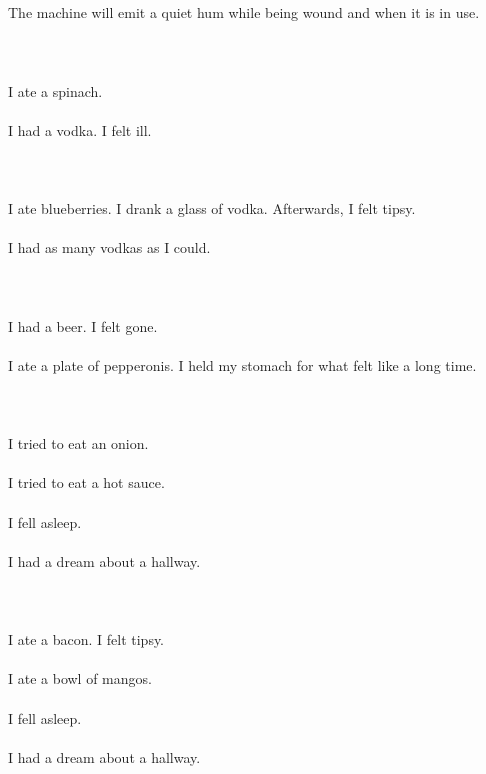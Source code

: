 \documentclass{article}
\begin{document}
    \section{}
    The machine will emit a quiet hum while being wound and when it is in use.\\\\ 
    \newpage
    
    \section{}
    I ate a spinach.\\\\I had a vodka. I felt ill.\\\\ 
    \newpage
    
    \section{}
    I ate blueberries. I drank a glass of vodka. Afterwards, I felt tipsy.\\\\I had as many vodkas as I could.\\\\ 
    \newpage
    
    \section{}
    I had a beer. I felt gone.\\\\I ate a plate of pepperonis. I held my stomach for what felt like a long time.\\\\ 
    \newpage
    
    \section{}
    I tried to eat an onion.\\\\I tried to eat a hot sauce.\\\\I fell asleep.\\\\I had a dream about a hallway.\\\\ 
    \newpage
    
    \section{}
    I ate a bacon. I felt tipsy.\\\\I ate a bowl of mangos.\\\\I fell asleep.\\\\I had a dream about a hallway.\\\\ 
    \newpage
    
\end{document}

